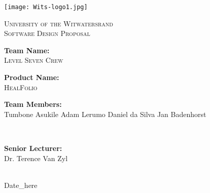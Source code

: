 \documentclass[a4paper]{article}
\begin{document}
\begin{titlepage}

\centering

\vfill

\texttt{[image: Wits-logo1.jpg]}

\vskip 0.1cm

\center 

\textsc{\LARGE University of the Witwatersrand}\\[0.5cm] 

\textsc{\Large Software Design Proposal} \\[0.5cm] 

\begin{minipage}{0.4\textwidth}

\begin{center} \large

\textbf{Team Name:} \\[0.3cm]

\textsc{Level Seven Crew} \\[0.3cm]

\end{center}

\begin{center} \large

\textbf{Product Name:} \\[0.3cm]

\textsc{HealFolio} \\[0.3cm]

\end{center}

\begin{flushleft} \large

\textbf{Team Members:} \\[0.3cm]

Tumbone Asukile\newline
Adam Lerumo\newline
Daniel da Silva\newline
Jan Badenhorst\newline

\end{flushleft}

\end{minipage} \\[0.7cm]

\begin{minipage}{0.4\textwidth}

\begin{flushright} \large

\textbf{Senior Lecturer:} \\[0.3cm]

Dr. Terence Van Zyl

\end{flushright}

\end{minipage} \\[1cm]

{\large Date\_here} 
    
\end{titlepage}
\end{document}
